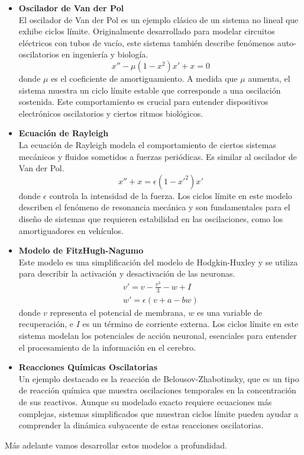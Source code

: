 \documentclass[12pt, a4paper]{report}
\begin{document}
\begin{itemize}
	\item \textbf{Oscilador de Van der Pol}\\
	
	El oscilador de Van der Pol es un ejemplo clásico de un sistema no lineal que exhibe ciclos límite. Originalmente desarrollado para modelar circuitos eléctricos con tubos de vacío, este sistema también describe fenómenos auto-oscilatorios en ingeniería y biología.
	\begin{equation}
		x''-\mu \left(1-x^2\right)x'+x=0
	\end{equation}
	donde $\mu$ es el coeficiente de amortiguamiento.  A medida que $\mu$ aumenta, el sistema muestra un ciclo límite estable que corresponde a una oscilación sostenida. Este comportamiento es crucial para entender dispositivos electrónicos oscilatorios y ciertos ritmos biológicos.
	\item \textbf{Ecuación de Rayleigh}\\
	
	La ecuación de Rayleigh modela el comportamiento de ciertos sistemas mecánicos y fluidos sometidos a fuerzas periódicas. Es similar al oscilador de Van der Pol.
	\begin{equation}
		x''+x=\epsilon\left(1-x'^2\right)x'
	\end{equation}
	donde $\epsilon$ controla la intensidad de la fuerza. Los ciclos límite en este modelo describen el fenómeno de resonancia mecánica y son fundamentales para el diseño de sistemas que requieren estabilidad en las oscilaciones, como los amortiguadores en vehículos.
	\item \textbf{Modelo de FitzHugh-Nagumo}\\
	
	Este modelo es una simplificación del modelo de Hodgkin-Huxley y se utiliza para describir la activación y desactivación de las neuronas. 
	\begin{equation}
		\begin{matrix}
			v'=v-\frac{v^3}{3}-w+I\\
			w'=\epsilon\left(v+a-bw\right)
		\end{matrix}
	\end{equation}
	donde $v$ representa el potencial de membrana, $w$ es una variable de recuperación, e $I$ es un término de corriente externa. Los ciclos límite en este sistema modelan los potenciales de acción neuronal, esenciales para entender el procesamiento de la información en el cerebro.\\
\newpage

	\item \textbf{Reacciones Químicas Oscilatorias}\\
	
	Un ejemplo destacado es la reacción de Belousov-Zhabotinsky, que es un tipo de reacción química que muestra oscilaciones temporales en la concentración de sus reactivos. Aunque su modelado exacto requiere ecuaciones más complejas, sistemas simplificados que muestran ciclos límite pueden ayudar a comprender la dinámica subyacente de estas reacciones oscilatorias.
\end{itemize}
Más adelante vamos desarrollar estos modelos a profundidad.
\newpage
\end{document}
